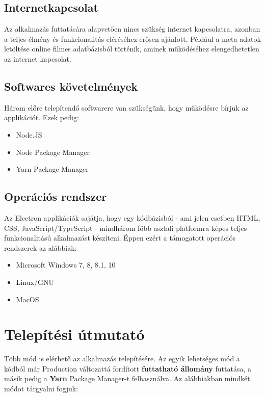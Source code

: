 \subsection{Internetkapcsolat}
Az alkalmazás futtatására alapvetően nincs szükség internet kapcsolatra, azonban a teljes élmény és funkcionalitás eléréséhez erősen ajánlott. Például a meta-adatok letöltése online filmes adatbázisból történik, aminek működéséhez elengedhetetlen az internet kapcsolat.

\subsection{Softwares követelmények}
Három előre telepítendő softwarere van szükségünk, hogy működésre bírjuk az applikációt. Ezek pedig:
\begin{itemize}
	\item Node.JS
	\item Node Package Manager
	\item Yarn Package Manager
\end{itemize}

\subsection{Operációs rendszer}
Az Electron applikációk sajátja, hogy egy kódbázisból - ami jelen esetben HTML, CSS, JavaScript/TypeScript - mindhárom főbb asztali platformra képes teljes funkcionalitású alkalmazást készíteni. Éppen ezért a támogatott operációs rendszerek az alábbiak:
\begin{itemize}
	\item Microsoft Windows 7, 8, 8.1, 10
	\item Linux/GNU
	\item MacOS
\end{itemize}

\section{Telepítési útmutató}
Több mód is elérhető az alkalmazás telepítésére. Az egyik lehetséges mód a kódból már Production változattá fordított {\textbf {futtatható állomány}} futtatása, a másik pedig a {\textbf {Yarn}} Package Manager-t felhasználva. Az alábbiakban mindkét módot tárgyalni fogjuk:

